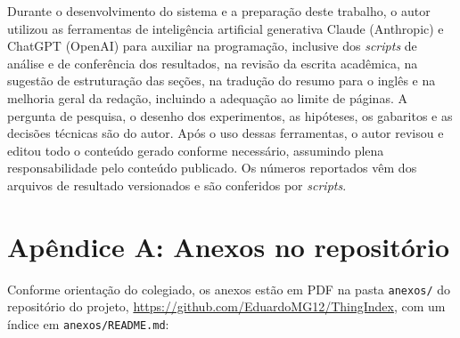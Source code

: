 \documentclass[12pt]{article}
\newcommand{\repositorio}{\url{https://github.com/EduardoMG12/ThingIndex}}
\begin{document}
Durante o desenvolvimento do sistema e a preparação deste trabalho, o autor utilizou as ferramentas de inteligência artificial generativa Claude (Anthropic) e ChatGPT (OpenAI) para auxiliar na programação, inclusive dos \emph{scripts} de análise e de conferência dos resultados, na revisão da escrita acadêmica, na sugestão de estruturação das seções, na tradução do resumo para o inglês e na melhoria geral da redação, incluindo a adequação ao limite de páginas. A pergunta de pesquisa, o desenho dos experimentos, as hipóteses, os gabaritos e as decisões técnicas são do autor. Após o uso dessas ferramentas, o autor revisou e editou todo o conteúdo gerado conforme necessário, assumindo plena responsabilidade pelo conteúdo publicado. Os números reportados vêm dos arquivos de resultado versionados e são conferidos por \emph{scripts}.




\appendix

\section*{Apêndice A: Anexos no repositório}

Conforme orientação do colegiado, os anexos estão em PDF na pasta \texttt{anexos/} do repositório do projeto, \repositorio, com um índice em \texttt{anexos/README.md}:
\end{document}
